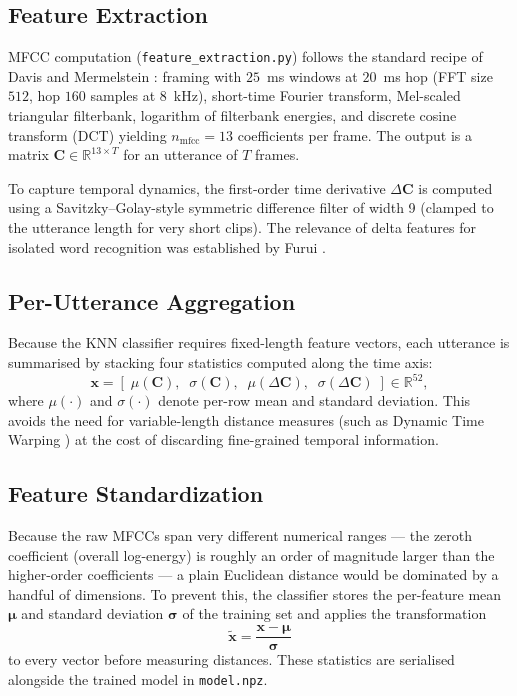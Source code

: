 \documentclass[12pt,a4paper]{article}
\begin{document}
\subsection{Feature Extraction}

MFCC computation (\texttt{feature\_extraction.py}) follows the standard
recipe of Davis and Mermelstein \cite{davis1980comparison}: framing with
$25$~ms windows at $20$~ms hop (FFT size $512$, hop $160$ samples at 8~kHz),
short-time Fourier transform, Mel-scaled triangular filterbank, logarithm of
filterbank energies, and discrete cosine transform (DCT) yielding $n_\text{mfcc}=13$
coefficients per frame. The output is a matrix
$\mathbf{C} \in \mathbb{R}^{13 \times T}$ for an utterance of $T$ frames.

To capture temporal dynamics, the first-order time derivative
$\Delta\mathbf{C}$ is computed using a Savitzky--Golay-style symmetric
difference filter of width 9 (clamped to the utterance length for very short
clips). The relevance of delta features for isolated word recognition was
established by Furui \cite{furui1986speaker}.

\subsection{Per-Utterance Aggregation}

Because the KNN classifier requires fixed-length feature vectors, each
utterance is summarised by stacking four statistics computed along the time
axis:
\begin{equation}
    \mathbf{x} = \left[\;
        \mu(\mathbf{C}),\;\;
        \sigma(\mathbf{C}),\;\;
        \mu(\Delta\mathbf{C}),\;\;
        \sigma(\Delta\mathbf{C})
    \;\right] \in \mathbb{R}^{52},
\end{equation}
where $\mu(\cdot)$ and $\sigma(\cdot)$ denote per-row mean and standard
deviation. This avoids the need for variable-length distance measures (such
as Dynamic Time Warping \cite{sakoe1978dynamic}) at the cost of discarding
fine-grained temporal information.

\subsection{Feature Standardization}

Because the raw MFCCs span very different numerical ranges --- the zeroth
coefficient (overall log-energy) is roughly an order of magnitude larger than
the higher-order coefficients --- a plain Euclidean distance would be
dominated by a handful of dimensions. To prevent this, the classifier stores
the per-feature mean $\boldsymbol\mu$ and standard deviation $\boldsymbol\sigma$ of the
training set and applies the transformation
\begin{equation}
    \tilde{\mathbf{x}} = \frac{\mathbf{x} - \boldsymbol\mu}{\boldsymbol\sigma}
\end{equation}
to every vector before measuring distances. These statistics are serialised
alongside the trained model in \texttt{model.npz}.
\end{document}
